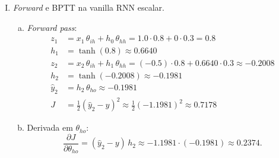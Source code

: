 \documentclass{dlproblemset}
\begin{document}
\begin{enumerate}[I)]
\begin{enumerate}[a)]
\begin{enumerate}[i.]
                    \item Em uma ConvRNN: As multiplicações de matrizes por $\mathbf{\Theta}_{ih}$ e $\mathbf{\Theta}_{hh}$ são substituídas por operações de convolução. Neste caso, o \textit{input} $\mathbf{x}_t$ é o próprio mapa de características 3D da CNN (ex: $7 \times 7 \times 512$). É necessário que sejam preservadas as dimensões espaciais, permitindo que a RNN ``lembre'' não apenas o que viu nos frames anteriores, mas onde (espacialmente) viu.
                \end{enumerate}

        \end{enumerate}

    \item \textit{Forward} e BPTT na vanilla RNN escalar.
    \begin{enumerate}[a)]
        \item \textit{Forward pass}:
        \begin{align*}
            z_1 &= x_1\,\theta_{ih} + h_0\,\theta_{hh} = 1.0\cdot 0.8 + 0\cdot 0.3 = 0.8 \\
            h_1 &= \tanh(0.8) \approx 0.6640 \\
            z_2 &= x_2\,\theta_{ih} + h_1\,\theta_{hh} = (-0.5)\cdot 0.8 + 0.6640\cdot 0.3 \approx -0.2008 \\
            h_2 &= \tanh(-0.2008) \approx -0.1981 \\
            \hat{y}_2 &= h_2\,\theta_{ho} \approx -0.1981 \\
            J &= \tfrac{1}{2}(\hat{y}_2 - y)^2 \approx \tfrac{1}{2}(-1.1981)^2 \approx 0.7178
        \end{align*}

        \item Derivada em $\theta_{ho}$:
        \[
            \frac{\partial J}{\partial \theta_{ho}} = (\hat{y}_2 - y)\,h_2 \approx -1.1981 \cdot (-0.1981) \approx 0.2374.
        \]


\end{enumerate}
\end{enumerate}
\end{document}
